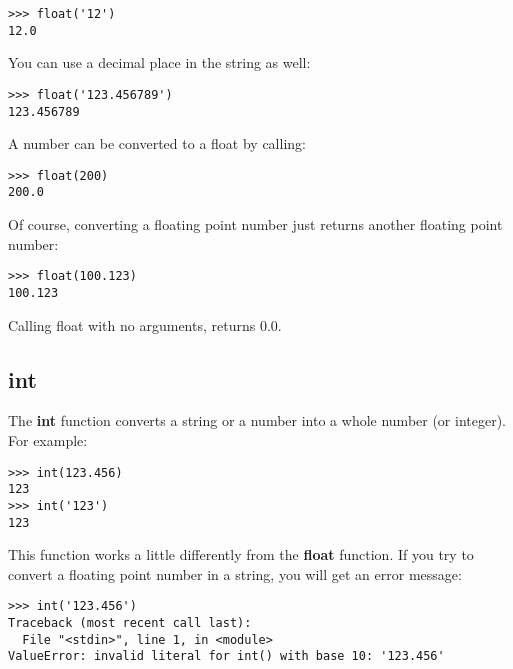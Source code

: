 \begin{listing}
\begin{verbatim}
>>> float('12')
12.0
\end{verbatim}
\end{listing}

\noindent
You can use a decimal place in the string as well:

\begin{listing}
\begin{verbatim}
>>> float('123.456789')
123.456789
\end{verbatim}
\end{listing}

\noindent
A number can be converted to a float by calling:

\begin{listing}
\begin{verbatim}
>>> float(200)
200.0
\end{verbatim}
\end{listing}

\noindent
Of course, converting a floating point number just returns another floating point number:

\begin{listing}
\begin{verbatim}
>>> float(100.123)
100.123
\end{verbatim}
\end{listing}

\noindent
Calling float with no arguments, returns 0.0.

\subsection*{int}

The \textbf{int} function converts a string or a number into a whole number (or integer). For example:

\begin{listing}
\begin{verbatim}
>>> int(123.456)
123
>>> int('123')
123
\end{verbatim}
\end{listing}

This function works a little differently from the \textbf{float} function. If you try to convert a floating point number in a string, you will get an error message:

\begin{listing}
\begin{verbatim}
>>> int('123.456')
Traceback (most recent call last):
  File "<stdin>", line 1, in <module>
ValueError: invalid literal for int() with base 10: '123.456'
\end{verbatim}
\end{listing}

